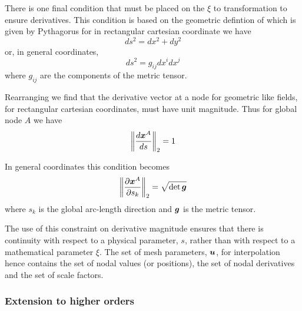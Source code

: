 There is one final condition that must be placed on the $\xi$ to \arclen
transformation to ensure \arclen derivatives. This condition is based on the
geometric defintion of \arclen which is given by Pythagorus \ie for \twods in
rectangular cartesian coordinate we have
\begin{equation}
  ds^{2}=dx^{2}+dy^{2}
  \label{eqn:arclengthpythagorus}
\end{equation}
or, in general coordinates,
\begin{equation}
  ds^{2}=g_{ij}dx^{i}dx^{j}
  \label{eqn:genarclengthpythagorus}
\end{equation}
where $g_{ij}$ are the components of the metric tensor.

Rearranging  we find that the \arclen derivative vector at a
node for geometric like fields, for rectangular cartesian coordinates, must
have unit magnitude. Thus for global node $A$ we have
\begin{equation}
  \norm{\dby{\nodept{\vect{x}}{A}}{s}}=1
  \label{eqn:chnormconstraint}
\end{equation}

In general coordinates this condition becomes
\begin{equation}
  \norm{\delby{\nodept{\vect{x}}{A}}{s_{k}}}=\sqrt{\det{\tensor{g}}}
  \label{eqn:genchnormconstraint}
\end{equation}
where $s_{k}$ is the  global arc-length direction and $\boldsymbol{g}$ is the metric tensor.

The use of this constraint on \arclen derivative magnitude ensures that there is continuity with respect to a physical parameter,
$s$, rather than with respect to a mathematical parameter $\xi$. The set of
mesh parameters, $\vect{u}$, for \cubicherm interpolation hence contains the
set of nodal values (or positions), the set of nodal \arclen derivatives and
the set of scale factors.

\subsubsection{Extension to higher orders}

